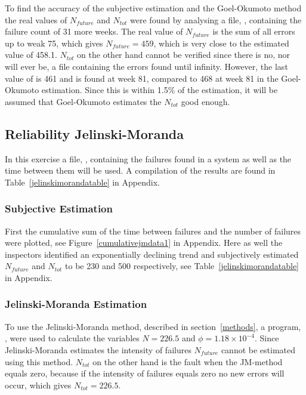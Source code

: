 \label{realdatago}
To find the accuracy of the subjective estimation and the Goel-Okumoto method the real values of $N_{future}$ and $N_{tot}$ were found by analysing a file, , containing the failure count of 31 more weeks. 
The real value of $N_{future}$ is the sum of all errors up to weak 75, which gives $N_{future}=459$, which is very close to the estimated value of 458.1. $N_{tot}$ on the other hand cannot be verified since there is no, nor will ever be, a file containing the errors found until infinity. However, the last value of  is 461 and is found at week 81, compared to 468 at week 81 in the Goel-Okumoto estimation. Since this is within 1.5\% of the estimation, it will be assumed that Goel-Okumoto estimates the $N_{tot}$ good enough.

\subsection{Reliability Jelinski-Moranda}
In this exercise a file, , containing the failures found in a system as well as the time between them will be used.
A compilation of the results are found in Table~\ref{jelinskimorandatable} in Appendix. 

\subsubsection*{Subjective Estimation} 
First the cumulative sum of the time between failures and the number of failures were plotted, see Figure~\ref{cumulativejmdata1} in Appendix. Here as well the inspectors identified an exponentially declining trend and subjectively estimated $N_{future}$ and $N_{tot}$ to be 230 and 500 respectively, see Table~\ref{jelinskimorandatable} in Appendix.

\subsubsection*{Jelinski-Moranda Estimation}
\label{jmestimation}
To use the Jelinski-Moranda method, described in section~\ref{methods}, a program, , were used to calculate the variables $N=226.5$ and $\phi=1.18\times10^{-4}$. Since Jelinski-Moranda estimates the intensity of failures $N_{future}$ cannot be estimated using this method.
$N_{tot}$ on the other hand is the fault when the JM-method equals zero, because if the intensity of failures equals zero no new errors will occur, which gives $N_{tot}=226.5$.

